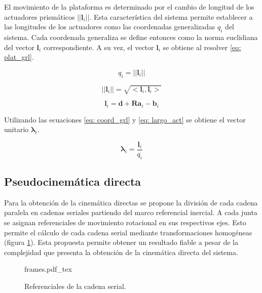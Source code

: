 El movimiento de la plataforma es determinado por el cambio de longitud
de los actuadores prismáticos $||\mathbf l_i||$.
Esta característica del sistema permite establecer
a las longitudes de los actuadores como las coordenadas 
generalizadas $q_i$ del sistema.
Cada coordenada generaliza se define entonces como la norma euclidiana
del vector $\mathbf l_i$ correspondiente.
A su vez, el vector $\mathbf l_i$ se obtiene al resolver 
\eqref{eq: plat_grl}.

\begin{equation} \label{eq: coord_grl}
    q_i = ||\mathbf l_i||
\end{equation}

\begin{equation} \label{eq: l}
    ||\mathbf l_i|| = \sqrt{<\mathbf l_i, \mathbf l_i>} 
\end{equation}

\begin{equation} \label{eq: largo_act}
\mathbf l_i = \mathbf d + \mathbf R \mathbf a_i - \mathbf b_i
\end{equation}

Utilizando las ecuaciones \ref{eq: coord_grl} y 
\ref{eq: largo_act} se obtiene el vector unitario 
$\boldsymbol \lambda_i$.

\begin{equation} \label{eq: vec_U}
\boldsymbol \lambda_i = \frac{\mathbf l_i}{q_i}
\end{equation}

\subsection{Pseudocinemática directa}

Para la obtención de la cinemática directas se propone la división de cada cadena paralela en 
cadenas seriales partiendo del marco referencial inercial.
A cada junta se asignan referenciales de movimiento rotacional  en sus
respectivos ejes.
Esto permite el cálculo de cada cadena serial mediante 
transformaciones homogéneas (figura \ref{fig: cadena serial}).
Esta propuesta permite obtener un resultado fiable a pesar de la 
complejidad que presenta la obtención de la 
cinemática directa del sistema.

\begin{figure}[htb!]
 \centering
 {frames.pdf_tex}
 \caption{Referenciales de la cadena serial.}
 \label{fig: cadena serial}
\end{figure}

